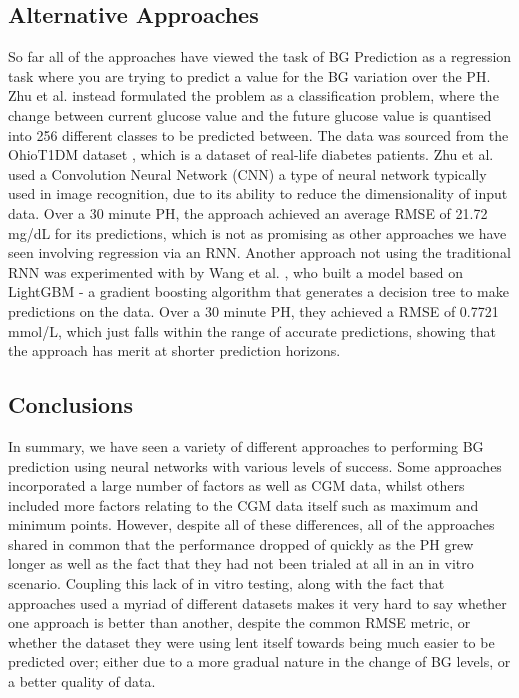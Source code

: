       \subsection{Alternative Approaches}

      So far all of the approaches have viewed the task of BG Prediction as a regression task where you are trying to predict a value for the BG variation over the PH. Zhu et al. \cite{paper7} instead formulated the problem as a classification problem, where the change between current glucose value and the future glucose value is quantised into 256 different classes to be predicted between. The data was sourced from the OhioT1DM dataset \cite{ohio}, which is a dataset of real-life diabetes patients. Zhu et al. used a Convolution Neural Network (CNN) \cite{whatiscnn} a type of neural network typically used in image recognition, due to its ability to reduce the dimensionality of input data. Over a 30 minute PH, the approach achieved an average RMSE of 21.72 mg/dL for its predictions, which is not as promising as other approaches we have seen involving regression via an RNN. Another approach not using the traditional RNN was experimented with by Wang et al. \cite{paper10}, who built a model based on LightGBM \cite{lightgbm} - a gradient boosting algorithm that generates a decision tree to make predictions on the data. Over a 30 minute PH, they achieved a RMSE of 0.7721 mmol/L, which just falls within the range of accurate predictions, showing that the approach has merit at shorter prediction horizons.

	\subsection{Conclusions}
      In summary, we have seen a variety of different approaches to performing BG prediction using neural networks with various levels of success. Some approaches incorporated a large number of factors as well as CGM data, whilst others included more factors relating to the CGM data itself such as maximum and minimum points. However, despite all of these differences, all of the approaches shared in common that the performance dropped of quickly as the PH grew longer as well as the fact that they had not been trialed at all in an in vitro scenario. Coupling this lack of in vitro testing, along with the fact that approaches used a myriad of different datasets makes it very hard to say whether one approach is better than another, despite the common RMSE metric, or whether the dataset they were using lent itself towards being much easier to be predicted over; either due to a more gradual nature in the change of BG levels, or a better quality of data. 

